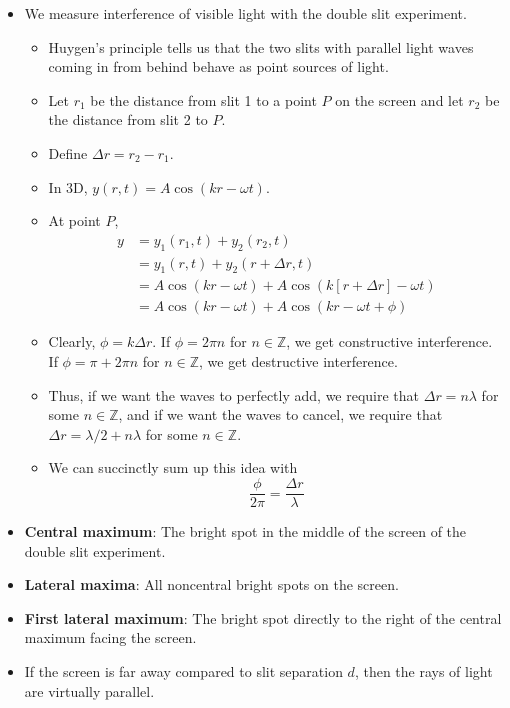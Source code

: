 \documentclass[../notes.tex]{subfiles}
\begin{document}
\begin{itemize}
    \item We measure interference of visible light with the double slit experiment.
    \begin{itemize}
        \item Huygen's principle tells us that the two slits with parallel light waves coming in from behind behave as point sources of light.
        \item Let $r_1$ be the distance from slit 1 to a point $P$ on the screen and let $r_2$ be the distance from slit 2 to $P$.
        \item Define $\Delta r=r_2-r_1$.
        \item In 3D, $y(r,t)=A\cos(kr-\omega t)$.
        \item At point $P$,
        \begin{align*}
            y &= y_1(r_1,t)+y_2(r_2,t)\\
            &= y_1(r,t)+y_2(r+\Delta r,t)\\
            &= A\cos(kr-\omega t)+A\cos(k[r+\Delta r]-\omega t)\\
            &= A\cos(kr-\omega t)+A\cos(kr-\omega t+\phi)
        \end{align*}
        \item Clearly, $\phi=k\Delta r$. If $\phi=2\pi n$ for $n\in\mathbb{Z}$, we get constructive interference. If $\phi=\pi+2\pi n$ for $n\in\mathbb{Z}$, we get destructive interference.
        \item Thus, if we want the waves to perfectly add, we require that $\Delta r=n\lambda$ for some $n\in\mathbb{Z}$, and if we want the waves to cancel, we require that $\Delta r=\lambda/2+n\lambda$ for some $n\in\mathbb{Z}$.
        \item We can succinctly sum up this idea with
        \begin{equation*}
            \frac{\phi}{2\pi} = \frac{\Delta r}{\lambda}
        \end{equation*}
    \end{itemize}
    \item \textbf{Central maximum}: The bright spot in the middle of the screen of the double slit experiment.
    \item \textbf{Lateral maxima}: All noncentral bright spots on the screen.
    \item \textbf{First lateral maximum}: The bright spot directly to the right of the central maximum facing the screen.
    \item If the screen is far away compared to slit separation $d$, then the rays of light are virtually parallel.
    \begin{figure}[h!]
        \centering
\end{figure}
\end{itemize}
\end{document}
